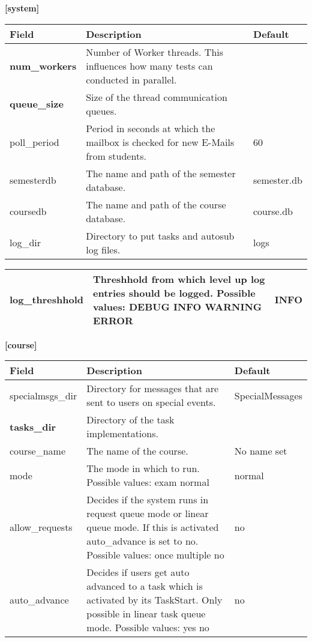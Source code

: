 {\bf [system]}\\
\begin{tabular}{|p{2.5cm}|p{8cm}|p{2.5cm}|}
\hline
{\bf Field} & {\bf Description} & {\bf Default}\\
\hline
\hline
\textbf{num\_workers} & Number of Worker threads. This influences how many tests can conducted
    in parallel. & ~ \\
\hline
\textbf{queue\_size} & Size of the thread communication queues. & ~\\
\hline
poll\_period & Period in seconds at which the mailbox is checked for new E-Mails from students. & 60\\
\hline
semesterdb & The name and path of the semester database. & semester.db\\
\hline
coursedb &  The name and path of the course database. & course.db\\
\hline
log\_dir & Directory to put tasks and autosub log files. & logs  \\
\hline
\end{tabular}
\begin{tabular}{|p{2.5cm}|p{8cm}|p{2.5cm}|}
\hline
log\_threshhold & Threshhold from which level up log entries should be logged.
    Possible values: DEBUG INFO WARNING ERROR & INFO\\
\hline
\end{tabular}

{\bf [course]}\\
\begin{tabular}{|p{2.5cm}|p{8cm}|p{2.5cm}|}
\hline
{\bf Field} & {\bf Description} & {\bf Default}\\
\hline
\hline
specialmsgs\_dir & Directory for messages that are sent to users on special events. &
    SpecialMessages \\
\hline
\textbf{tasks\_dir} & Directory of the task implementations. & ~ \\
\hline
course\_name & The name of the course. & No name set \\
\hline
mode & The mode in which to run. Possible values: exam normal & normal \\
\hline
allow\_requests & Decides if the system runs in request queue mode or linear queue mode. If this is activated
    auto\_advance is set to no. Possible values: once multiple no & no \\
\hline
auto\_advance & Decides if users get auto advanced to a task which is activated by its
    TaskStart. Only possible in linear task queue mode. Possible values: yes no & no \\
\hline
\end{tabular}

